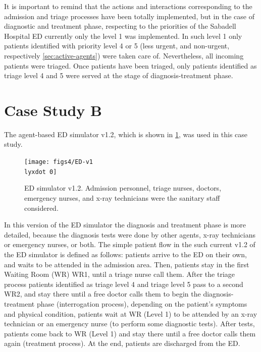 It is important to remind that the actions and interactions corresponding
to the admission and triage processes have been totally implemented,
but in the case of diagnostic and treatment phase, respecting to the
priorities of the Sabadell Hospital ED currently only the level 1
was implemented. In such level 1 only patients identified with priority
level 4 or 5 (less urgent, and non-urgent, respectively \ref{sec:active-agents})
were taken care of. Nevertheless, all incoming patients were triaged.
Once patients have been triaged, only patients identified as triage
level 4 and 5 were served at the stage of diagnosis-treatment phase.


\section{Case Study B \label{sub:Case-Study-B}}

The agent-based ED simulator v1.2, which is shown in \ref{fig:ED-SIM-2-1},
was used in this case study. 
\begin{figure}[h]
\noindent \begin{centering}
\texttt{[image: figs4/ED-v1\\lyxdot 0]}
\par\end{centering}

\caption{ED simulator v1.2. Admission personnel, triage nurses, doctors, emergency
nurses, and x-ray technicians were the sanitary staff considered.\label{fig:ED-SIM-2-1}}
\end{figure}
 In this version of the ED simulator the diagnosis and treatment phase
is more detailed, because the diagnosis tests were done by other agents,
x-ray technicians or emergency nurses, or both. The simple patient
flow in the such current v1.2 of the ED simulator is defined as follows:
patients arrive to the ED on their own, and waits to be attended in
the admission area. Then, patients stay in the first Waiting Room
(WR) WR1, until a triage nurse call them. After the triage process
patients identified as triage level 4 and triage level 5 pass to a
second WR2, and stay there until a free doctor calls them to begin
the diagnosis-treatment phase (interrogation process), depending on
the patient's symptoms and physical condition, patients wait at WR
(Level 1) to be attended by an x-ray technician or an emergency nurse
(to perform some diagnostic tests). After tests, patients come back
to WR (Level 1) and stay there until a free doctor calls them again
(treatment process). At the end, patients are discharged from the
ED. 

